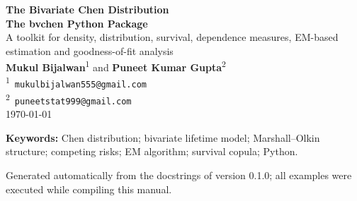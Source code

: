 \documentclass[11pt,a4paper]{article}
\newcommand{\proglang}[1]{\textsf{#1}}
\newcommand{\pypkg}[1]{\textbf{#1}}
\begin{document}
\begin{titlepage}
\centering
\vspace*{1.5cm}
{\Huge \bfseries The Bivariate Chen Distribution\\[0.6em]
The \textsf{bvchen} \proglang{Python} Package\\[1.2em]}
{\Large A toolkit for density, distribution, survival, dependence
measures, EM-based estimation and goodness-of-fit analysis\\[2em]}
{\large
\textbf{Mukul Bijalwan}\textsuperscript{1} \quad and \quad
\textbf{Puneet Kumar Gupta}\textsuperscript{2}\\[1em]}
{\normalsize
\textsuperscript{1}\ \texttt{mukulbijalwan555@gmail.com}\\
\textsuperscript{2}\ \texttt{puneetstat999@gmail.com}\\[2em]}
{\normalsize \today}
\vspace{1.5em}

\begin{minipage}{0.88\textwidth}
\begin{abstract}
\noindent
This manual documents the \pypkg{bvchen} package, a \proglang{Python}
implementation of the bivariate extension of the bathtub-shaped Chen
distribution proposed by Gupta, Pundir, Sharma and Mesfioui (2022,
\emph{Life Cycle Reliability and Safety Engineering} 11:247--259),
constructed from three independent latent Chen (2000) components
through competing risks. The package provides the joint density,
distribution and survival functions (including the singular component
on the diagonal), random variate generation, marginal and conditional
distributions, a Marshall--Olkin type survival copula with Kendall's
$\tau$, joint moments, maximum-likelihood estimation via the EM
algorithm, Kolmogorov--Smirnov goodness-of-fit tests and Q--Q
diagnostics. Every documented function is illustrated with executable
examples whose live output appears directly beneath the code in this
document.
\end{abstract}
\end{minipage}

\vspace{1em}
{\small \textbf{Keywords:} Chen distribution; bivariate lifetime
model; Marshall--Olkin structure; competing risks; EM algorithm;
survival copula; \proglang{Python}.}

\vspace{1em}
{\footnotesize Generated automatically from the docstrings of version
0.1.0; all examples were executed while compiling this manual.}
\vspace*{\fill}
\end{titlepage}
\end{document}
